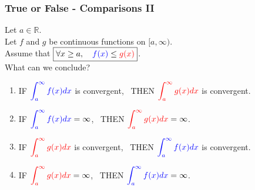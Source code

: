 \documentclass[14pt]{beamer}
\begin{document}
	\begin{frame}[t]
		\fontsize{11}{11}\selectfont
		\frametitle{True or False - Comparisons II}

		Let $a \in \mathbb{R}$. \\ Let $f$ and $g$ be continuous functions on
		$[a, \infty)$. \\ Assume that $\displaystyle \boxed{\forall x \geq a, \quad {\color{blue} f(x)} \leq {\color{red} g(x)}}$.
		\\ What can we conclude?

		\begin{enumerate}
			\item IF $\displaystyle{\color{blue} \int_a^{\infty} f(x) dx}$ is convergent,
				\, THEN $\displaystyle{\color{red} \int_a^{\infty} g(x) dx}$ is
				convergent.

			\item IF $\displaystyle{\color{blue} \int_a^{\infty} f(x) dx}= \infty$, \,
				THEN $\displaystyle{\color{red} \int_a^{\infty} g(x) dx}= \infty$.

			\item IF $\displaystyle{\color{red} \int_a^{\infty} g(x) dx}$ is convergent,
				\, THEN $\displaystyle{\color{blue} \int_a^{\infty} f(x) dx}$ is
				convergent.

			\item IF $\displaystyle{\color{red} \int_a^{\infty} g(x) dx}= \infty$, \,
				THEN $\displaystyle{\color{blue} \int_a^{\infty} f(x) dx}= \infty$.
		\end{enumerate}
	\end{frame}
\end{document}
